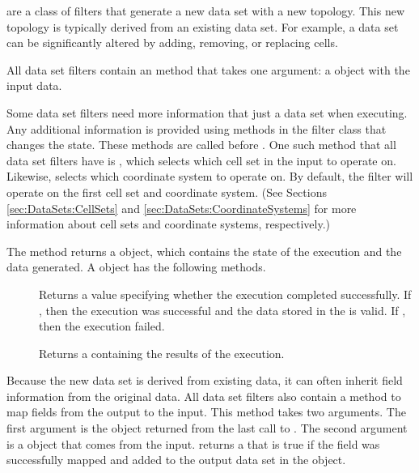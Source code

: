  are a class of filters that generate a new data
set with a new topology. This new topology is typically derived from an
existing data set. For example, a data set can be significantly altered by
adding, removing, or replacing cells.

All data set filters contain an  method that takes one
argument: a  object with the input data.

Some data set filters need more information that just a data set when
executing. Any additional information is provided using methods in the
filter class that changes the state. These methods are called before
. One such method that all data set filters have is
, which selects which cell set in the input
 to operate on. Likewise,
 selects which coordinate system to
operate on. By default, the filter will operate on the first cell set and
coordinate system. (See Sections \ref{sec:DataSets:CellSets} and
\ref{sec:DataSets:CoordinateSystems} for more information about cell sets
and coordinate systems, respectively.)

The  method returns a  object,
which contains the state of the execution and the data generated. A
 object has the following methods.

\begin{description}
\item[] Returns a  value specifying
  whether the execution completed successfully. If , then
  the execution was successful and the data stored in the
   is valid. If , then the
  execution failed.
\item[] Returns a  containing
  the results of the execution.
\end{description}

Because the new data set is derived from existing data, it can often
inherit field information from the original data. All data set filters also
contain a  method to map fields from the
output to the input. This method takes two arguments. The first argument is
the  object returned from the last call to
. The second argument is a  object that
comes from the input.  returns a
 that is true if the field was successfully mapped and added
to the output data set in the  object.

